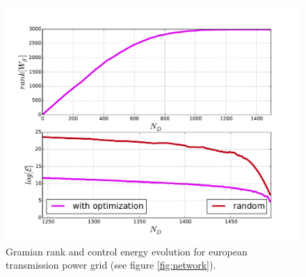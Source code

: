 \documentclass[conference]{IEEEtran}
\begin{document}
\begin{figure}
\includegraphics[scale=.4]{figs2}
\caption{Gramian rank and control energy evolution for european transmission power grid (see figure \ref{fig:network}).}
\label{fig:real_case}
\end{figure}


\end{document}
